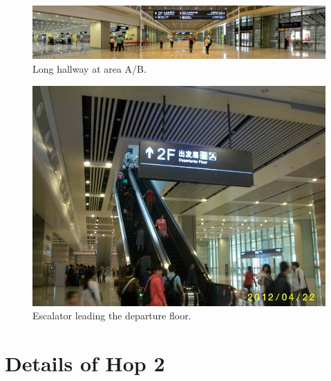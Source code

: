 \documentclass[11pt]{article}
\begin{document}
  \begin{figure}[!h]
    \centering
    	\includegraphics[scale=1.5]{image030.jpg}
    	\caption{Long hallway at area A/B. \label{pic12}}
 \end{figure}
   \begin{figure}[!h]
    \centering
    	\includegraphics{image032.jpg}
    	\caption{Escalator leading the departure floor. \label{pic13}}
 \end{figure}
  
\newpage
\section{Details of Hop 2}
\end{document}
